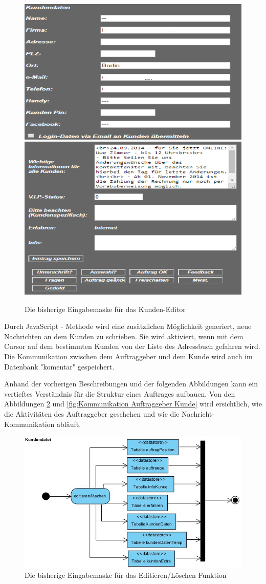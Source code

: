 \pagebreak

\begin{figure}[h]
	\centering
	\includegraphics[width=0.7\linewidth]{Graphics/kundeEditieren.png}
	\includegraphics[width=0.7\linewidth]{Graphics/kundeEditieren1.png}
	\caption[Kundeansicht]{Die bisherige Eingabemaske für das Kunden-Editor}
	\label{fig:KundenEditor}
\end{figure}


Durch JavaScript - Methode wird eine zusätzlichen Möglichkeit generiert, neue Nachrichten an dem Kunden zu schrieben. Sie wird aktiviert, wenn mit dem Cursor auf dem bestimmten Kunden von der Liste des Adressbuch gefahren wird. Die Kommunikation zwischen dem Auftraggeber und dem Kunde wird auch im Datenbank "komentar" gespeichert. 

Anhand der vorherigen Beschreibungen und der folgenden Abbildungen kann ein vertieftes Verständnis für die Struktur eines Auftrages aufbauen. Von den Abbildungen \ref{fig:Kunden Datei Editieren und Löschen} und \ref{fig:Kommunikation Auftraggeber Kunde} wird ersichtlich, wie die Aktivitäten des Auftraggeber geschehen und wie die Nachricht-Kommunikation abläuft.
\pagebreak


\begin{figure}[h]
	\centering
	\includegraphics[width=0.7\linewidth]{Graphics/Kundendatei.JPG}
	\caption[Kundeansicht]{Die bisherige Eingabemaske für das Editieren/Löschen Funktion}
	\label{fig:Kunden Datei Editieren und Löschen}
\end{figure}

